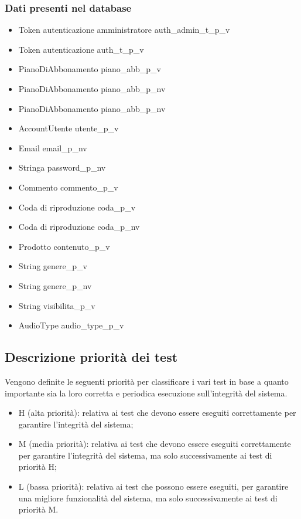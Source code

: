 \subsubsection{Dati presenti nel database}
\begin{itemize}
    \item Token autenticazione amministratore auth\_admin\_t\_p\_v
    \item Token autenticazione auth\_t\_p\_v
    \item PianoDiAbbonamento piano\_abb\_p\_v
    \item PianoDiAbbonamento piano\_abb\_p\_nv
    \item PianoDiAbbonamento piano\_abb\_p\_nv
    \item AccountUtente utente\_p\_v
    \item Email email\_p\_nv
    \item Stringa password\_p\_nv
    \item Commento commento\_p\_v
    \item Coda di riproduzione coda\_p\_v
    \item Coda di riproduzione coda\_p\_nv
    \item Prodotto contenuto\_p\_v
    \item String genere\_p\_v
    \item String genere\_p\_nv
    \item String visibilita\_p\_v
    \item AudioType audio\_type\_p\_v

\end{itemize}

\subsection{Descrizione priorità dei test}

Vengono definite le seguenti priorità per classificare i vari test in base a quanto importante sia la
loro corretta e periodica esecuzione sull'integrità del sistema.
\begin{itemize}
    \item H (alta priorità): relativa ai test che devono essere eseguiti correttamente per garantire l'integrità
          del sistema;
    \item M (media priorità): relativa ai test che devono essere eseguiti correttamente per garantire l'integrità
          del sistema, ma solo successivamente ai test di priorità H;
    \item L (bassa priorità): relativa ai test che possono essere eseguiti, per garantire una migliore funzionalità
          del sistema, ma solo successivamente ai test di priorità M.
\end{itemize}


